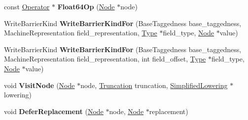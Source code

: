 \begin{DoxyCompactItemize}
\item 
const \hyperlink{classv8_1_1internal_1_1compiler_1_1_operator}{Operator} $\ast$ {\bfseries Float64\+Op} (\hyperlink{classv8_1_1internal_1_1compiler_1_1_node}{Node} $\ast$node)\hypertarget{classv8_1_1internal_1_1compiler_1_1_representation_selector_ae567cdfcdf93bb5487b1f7711da640f7}{}\label{classv8_1_1internal_1_1compiler_1_1_representation_selector_ae567cdfcdf93bb5487b1f7711da640f7}

\item 
Write\+Barrier\+Kind {\bfseries Write\+Barrier\+Kind\+For} (Base\+Taggedness base\+\_\+taggedness, Machine\+Representation field\+\_\+representation, \hyperlink{classv8_1_1internal_1_1_type}{Type} $\ast$field\+\_\+type, \hyperlink{classv8_1_1internal_1_1compiler_1_1_node}{Node} $\ast$value)\hypertarget{classv8_1_1internal_1_1compiler_1_1_representation_selector_a5a28b9aa5b926dc1cb8adec3023630cf}{}\label{classv8_1_1internal_1_1compiler_1_1_representation_selector_a5a28b9aa5b926dc1cb8adec3023630cf}

\item 
Write\+Barrier\+Kind {\bfseries Write\+Barrier\+Kind\+For} (Base\+Taggedness base\+\_\+taggedness, Machine\+Representation field\+\_\+representation, int field\+\_\+offset, \hyperlink{classv8_1_1internal_1_1_type}{Type} $\ast$field\+\_\+type, \hyperlink{classv8_1_1internal_1_1compiler_1_1_node}{Node} $\ast$value)\hypertarget{classv8_1_1internal_1_1compiler_1_1_representation_selector_a061b383863381902f1f83c93e38bb9ea}{}\label{classv8_1_1internal_1_1compiler_1_1_representation_selector_a061b383863381902f1f83c93e38bb9ea}

\item 
void {\bfseries Visit\+Node} (\hyperlink{classv8_1_1internal_1_1compiler_1_1_node}{Node} $\ast$node, \hyperlink{classv8_1_1internal_1_1compiler_1_1_truncation}{Truncation} truncation, \hyperlink{classv8_1_1internal_1_1compiler_1_1_simplified_lowering}{Simplified\+Lowering} $\ast$lowering)\hypertarget{classv8_1_1internal_1_1compiler_1_1_representation_selector_a1ee36edb47f10146b3bf45abf8ab13a5}{}\label{classv8_1_1internal_1_1compiler_1_1_representation_selector_a1ee36edb47f10146b3bf45abf8ab13a5}

\item 
void {\bfseries Defer\+Replacement} (\hyperlink{classv8_1_1internal_1_1compiler_1_1_node}{Node} $\ast$node, \hyperlink{classv8_1_1internal_1_1compiler_1_1_node}{Node} $\ast$replacement)\hypertarget{classv8_1_1internal_1_1compiler_1_1_representation_selector_a64aed096cd7192965e674d8b2d3773af}{}\label{classv8_1_1internal_1_1compiler_1_1_representation_selector_a64aed096cd7192965e674d8b2d3773af}


\end{DoxyCompactItemize}
